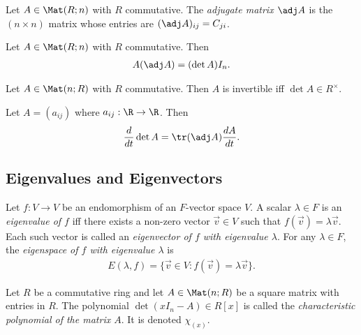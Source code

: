 \documentclass{article}
\begin{document}
\begin{definition}
	Let $A\in\Mat(R;n)$ with $R$ commutative. The \emph{adjugate matrix $\adj A$} is the
	$(n\times n)$ matrix whose entries are $(\adj A)_{ij} = C_{ji}$.
\end{definition}

\begin{theorem}
	Let $A\in\Mat(R;n)$ with $R$ commutative. Then
	\begin{align*}
		A(\adj A) = (\det A)I_n.
	\end{align*}
\end{theorem}

\begin{corollary}[Corollary 4.4.11]
	Let $A\in\Mat(n;R)$ with $R$ commutative. Then $A$ is invertible iff $\det A\in R^\times$.
\end{corollary}

\begin{theorem}
	Let $A=(a_{ij})$ where $a_{ij}:\R\to\R$. Then
	\begin{align*}
		\frac{d}{dt}\det A = \tr(\adj A)\frac{dA}{dt}.
	\end{align*}
\end{theorem}

\subsection{Eigenvalues and Eigenvectors}

\begin{definition}
	Let $f:V\to V$ be an endomorphism of an $F$-vector space $V$. A scalar $\lambda\in F$ is
	an \emph{eigenvalue of $f$} iff there exists a non-zero vector $\vec v \in V$ such that
	$f(\vec v)=\lambda \vec v$. Each such vector is called an \emph{eigenvector of $f$ with
		eigenvalue $\lambda$}. For any $\lambda\in F$, the \emph{eigenspace of $f$ with eigenvalue $\lambda$}
	is
	\begin{align*}
		E(\lambda,f) = \{\vec v\in V:f(\vec v)=\lambda\vec v\}.
	\end{align*}
\end{definition}

\begin{definition}
	Let $R$ be a commutative ring and let $A\in\Mat(n; R)$ be a square matrix with entries in $R$.
	The polynomial $\det(xI_n-A)\in R[x]$ is called the \emph{characteristic polynomial of the matrix
		$A$}. It is denoted $\chi_(x)$.
\end{definition}
\end{document}
